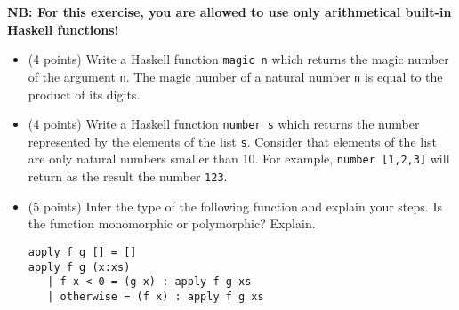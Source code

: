 \textbf{NB: For this exercise, you are allowed to use only arithmetical built-in Haskell functions!}
\begin{itemize}
%
\item (4 points) Write a Haskell function \texttt{magic n} which returns the magic number of the argument \texttt{n}. The magic number of a natural number \texttt{n} is equal to the product of its digits.
\vspace{9cm}
%
\item (4 points) Write a Haskell function \texttt{number s} which returns the number represented by the elements of the list \texttt{s}. Consider that elements of the list are only natural numbers smaller than 10. For example, \texttt{number [1,2,3]} will return as the result the number \texttt{123}. 
%
\newpage
\item (5 points) Infer the type of the following function and explain your steps. Is the function monomorphic or polymorphic? Explain.
\begin{verbatim}
apply f g [] = []
apply f g (x:xs)
   | f x < 0 = (g x) : apply f g xs
   | otherwise = (f x) : apply f g xs
\end{verbatim}
\end{itemize}